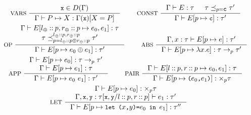 \begin{figure}
  \centering
  \begin{gather*}
    \inference[ VARS ]{ %
      \cc{x} \in \domain(\Gamma) }{ %
      \Gamma \judges P \mapsto X : %
      \Gamma(\cc{x})[ X = P ] } \qquad
    \inference[ CONST ]{ %
      \Gamma \judges E : \tau & %
      \tau \subtype_{ p = \cc{c} } \tau' }{ %
      \Gamma \judges \upd{ E }{ p }{ \cc{c} } : \tau' } \\
    \inference[ OP ]{ %
      \Gamma \judges %
      \upd{ E }{ \leftopchild \cons p, %
        \rightopchild \cons p}{ %
        e_0, e_1 } : \tau \\ %
      \tau \subtype_{ p = \leftopchild \cons p \oplus \rightopchild \cons p }^{ \leftopchild \cons p, \rightopchild \cons p}
      \tau' }{ %
      \Gamma \judges \upd{ E }{ p }{ e_0 \oplus e_1 } : \tau' } \qquad
    \inference[ ABS ]{ 
      \Gamma, x : \tau \judges \upd{ E }{ p }{ e } : \tau' }{ %
      \Gamma \judges \upd{ E }{ p }{ \lambda x. e } : %
      \tau \to_p \tau' } \\
    \inference[ APP ]{ %
      \Gamma \judges \upd{E}{p}{e_0} : \tau \to_p \tau' \\
      \Gamma \judges \upd{E}{p}{e_1} : \tau }{
      \Gamma \judges \upd{ E }{ p }{e_0\ e_1} : \tau' } \qquad
    \inference[ PAIR ]{
      \Gamma \judges %
      \upd{E}{\leftchild \cons p, \rightchild \cons p}{ e_0, e_1 } : %
      \tau }{ %
      \Gamma \judges \upd{E}{p}{ \pair{e_0}{e_1} } : \times_p \tau } \\
    \inference[ LET ]{
      \Gamma \judges \upd{ E }{p}{ e_0 } : \times_p \tau \\
      \Gamma, \cc{x}, \cc{y} : %
      \replace{ \tau }{ l \cons p, r \cons p }{\cc{x}, \cc{y}} \judges %
      e_1 : \tau' }{
      \Gamma \judges \upd{E}{p}{ \letexp{x}{y}{e_0}{e_1} } : \tau'' } \qquad

\end{gather*}
\end{figure}

